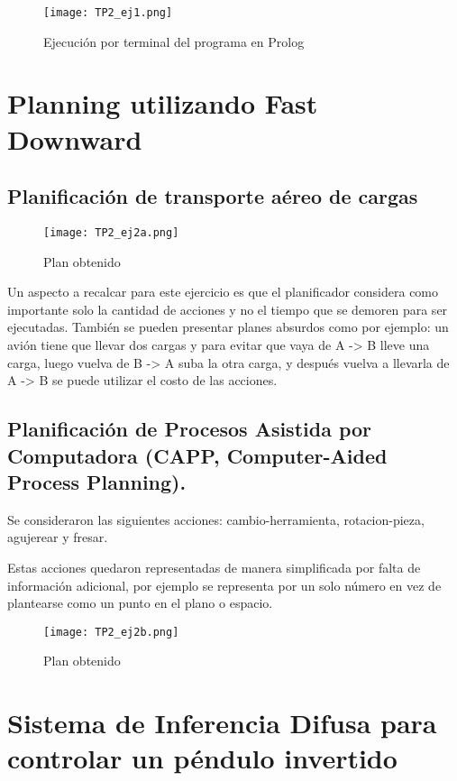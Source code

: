 \documentclass{article}
\begin{document}
\begin{figure}[ht]
    \centering
    \texttt{[image: TP2\_ej1.png]}
    \caption{Ejecución por terminal del programa en Prolog}
    \label{fig:TP2_ej1}
\end{figure}

\section{Planning utilizando Fast Downward}
    
\subsection{Planificación de transporte aéreo de cargas}

\begin{figure}[ht]
    \centering
    \texttt{[image: TP2\_ej2a.png]}
    \caption{Plan obtenido}
    \label{fig:TP2_ej2a}
\end{figure}

Un aspecto a recalcar para este ejercicio es que el planificador considera como importante solo la cantidad de acciones y no el tiempo que se demoren para ser ejecutadas. También se pueden presentar planes absurdos como por ejemplo: un avión tiene que llevar dos cargas y para evitar que vaya de A -> B lleve una carga, luego vuelva de B -> A suba la otra carga, y después vuelva a llevarla de A -> B se puede utilizar el costo de las acciones.

\subsection{Planificación de Procesos Asistida por Computadora (CAPP, Computer-Aided Process Planning). }

Se consideraron las siguientes acciones: cambio-herramienta, rotacion-pieza, agujerear y fresar.

Estas acciones quedaron representadas de manera simplificada por falta de información adicional, por ejemplo se representa por un solo número en vez de plantearse como un punto en el plano o espacio.

\begin{figure}[ht]
    \centering
    \texttt{[image: TP2\_ej2b.png]}
    \caption{Plan obtenido}
    \label{fig:TP2_ej2b}
\end{figure}

\section{Sistema de Inferencia Difusa para controlar un péndulo invertido}
\end{document}
